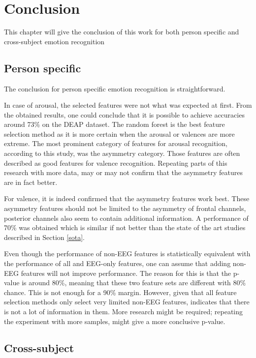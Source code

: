 \chapter{Conclusion}
{\samenvatting This chapter will give the conclusion of this work for both person specific and cross-subject emotion recognition}

\section{Person specific}
The conclusion for person specific emotion recognition is straightforward. 

In case of arousal, the selected features were not what was expected at first. From the obtained results, one could conclude that it is possible to achieve accuracies around 73\% on the DEAP dataset. The random forest is the best feature selection method as it is more certain when the arousal or valences are more extreme. The most prominent category of features for arousal recognition, according to this study, was the asymmetry category. Those features are often described as good features for valence recognition. Repeating parts of this research with more data, may or may not confirm that the asymmetry features are in fact better.

\npar

For valence, it is indeed confirmed that the asymmetry features work best. These asymmetry features should not be limited to the asymmetry of frontal channels, posterior channels also seem to contain additional information. A performance of 70\% was obtained which is similar if not better than the state of the art studies described in Section \ref{sota}. 

\npar

Even though the performance of non-EEG features is statistically equivalent with the performance of all and EEG-only features, one can assume that adding non-EEG features will not improve performance. The reason for this is that the p-value is around 80\%, meaning that these two feature sets are different with 80\% chance. This is not enough for a 90\% margin. However, given that all feature selection methods only select very limited non-EEG features, indicates that there is not a lot of information in them. More research might be required; repeating the experiment with more samples, might give a more conclusive p-value.

\clearpage

\section{Cross-subject}

